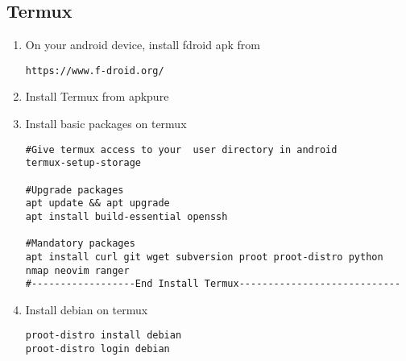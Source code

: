 \subsection{Termux}
\begin{enumerate}[label=\arabic*.,ref=\theenumi]
	\item On your android device, install 
fdroid apk from
%
\begin{lstlisting}
https://www.f-droid.org/
\end{lstlisting}
\item Install Termux from apkpure
\item Install basic packages on termux 
\begin{lstlisting}
#Give termux access to your  user directory in android
termux-setup-storage

#Upgrade packages
apt update && apt upgrade
apt install build-essential openssh

#Mandatory packages
apt install curl git wget subversion proot proot-distro python  nmap neovim ranger
#------------------End Install Termux----------------------------
\end{lstlisting}
\item Install debian on termux 
\begin{lstlisting}
proot-distro install debian
proot-distro login debian
\end{lstlisting}
\end{enumerate}
